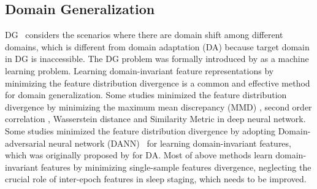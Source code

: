 \documentclass[letterpaper]{article} %
\begin{document}
	\subsection{Domain Generalization}
	DG~\citep{gulrajani2021in, zhou2021domain, wang2022generalizing} considers the scenarios where there are domain shift among different domains, which is different from domain adaptation (DA) \citep{wang2018deep, zhao2021plug} because target domain in DG is inaccessible.
	The DG problem was formally introduced by \citet{blanchard2011generalizing, muandet2013domain} as a machine learning problem.
	Learning domain-invariant feature representations by minimizing the feature distribution divergence is a common and effective method for domain generalization.
	Some studies minimized the feature distribution divergence by minimizing the maximum mean discrepancy (MMD) \citep{tzeng2014deep, wang2018visual, wang2020transfer}, second order correlation \citep{sun2016return, sun2016deep}, Wasserstein distance \citep{zhou2020domain} and Similarity Metric \citep{dou2019domain} in deep neural network.
	Some studies minimized the feature distribution divergence by adopting Domain-adversarial neural network (DANN)~\citep{li2018domain} for learning domain-invariant features, which was originally proposed by \citet{ganin2015unsupervised} for DA.
	Most of above methods learn domain-invariant features by minimizing single-sample features divergence, neglecting the crucial role of inter-epoch features in sleep staging, which needs to be improved.
%
\end{document}

